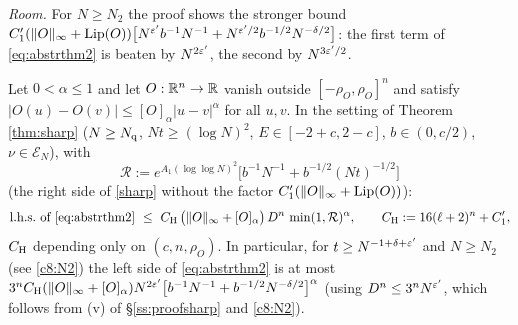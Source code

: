 \noindent\emph{Room.} For $N\ge N_2$ the proof shows the stronger bound $C_1'(\|O\|_\infty+\operatorname{Lip}(O))\big[N^{\varepsilon'}b^{-1}N^{-1}+N^{\varepsilon'/2}b^{-1/2}N^{-\delta/2}\big]$: the first term of \eqref{eq:abstrthm2} is beaten by $N^{2\varepsilon'}$, the second by $N^{3\varepsilon'/2}$.

\begin{corollary}\label{cor:cont}
Let $0<\alpha\le1$ and let $O:\mathbb{R}^n\to\mathbb{R}$ vanish outside $[-\rho_O,\rho_O]^n$ and satisfy $|O(u)-O(v)|\le[O]_\alpha|u-v|^\alpha$ for all $u,v$. In the setting of Theorem \ref{thm:sharp} ($N\ge N_{\rm q}$, $Nt\ge(\log N)^2$, $E\in[-2+c,2-c]$, $b\in(0,c/2)$, $\nu\in\mathcal E_N$), with
\[
\mathcal R:=e^{A_1(\log\log N)^2}\Big[b^{-1}N^{-1}+b^{-1/2}(Nt)^{-1/2}\Big]
\]
(the right side of \eqref{sharp} without the factor $C_1'(\|O\|_\infty+\operatorname{Lip}(O))$):
\[
\text{l.h.s.\ of \eqref{eq:abstrthm2}}\ \le\ C_{\rm H}\,\big(\|O\|_\infty+[O]_\alpha\big)\,D^n\,\min(1,\mathcal R)^{\alpha},\qquad C_{\rm H}:=16(\ell+2)^n+C_1',
\]
$C_{\rm H}$ depending only on $(c,n,\rho_O)$. In particular, for $t\ge N^{-1+\delta+\varepsilon'}$ and $N\ge N_2$ (see \eqref{c8:N2}) the left side of \eqref{eq:abstrthm2} is at most $3^nC_{\rm H}(\|O\|_\infty+[O]_\alpha)N^{2\varepsilon'}\big[b^{-1}N^{-1}+b^{-1/2}N^{-\delta/2}\big]^\alpha$ (using $D^n\le3^nN^{\varepsilon'}$, which follows from (v) of \S\ref{ss:proofsharp} and \eqref{c8:N2}).
\end{corollary}

